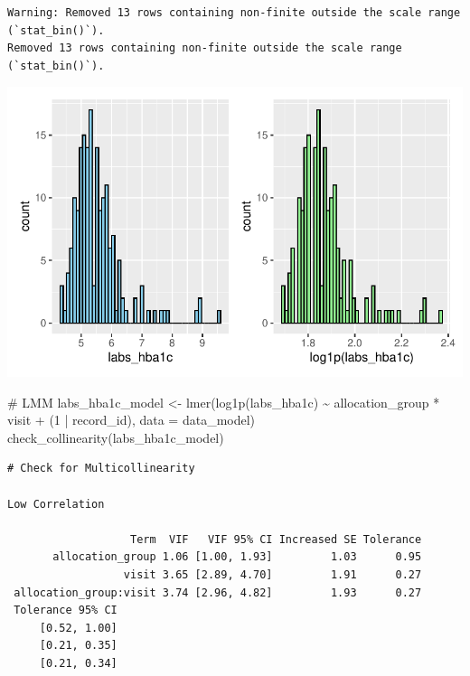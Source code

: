 \documentclass[
  letterpaper,
  DIV=11,
  numbers=noendperiod]{scrartcl}
\newenvironment{Shaded}{\begin{snugshade}}{\end{snugshade}}
\newcommand{\AttributeTok}[1]{\textcolor[rgb]{0.40,0.45,0.13}{#1}}
\newcommand{\CommentTok}[1]{\textcolor[rgb]{0.37,0.37,0.37}{#1}}
\newcommand{\DecValTok}[1]{\textcolor[rgb]{0.68,0.00,0.00}{#1}}
\newcommand{\FunctionTok}[1]{\textcolor[rgb]{0.28,0.35,0.67}{#1}}
\newcommand{\NormalTok}[1]{\textcolor[rgb]{0.00,0.23,0.31}{#1}}
\newcommand{\OtherTok}[1]{\textcolor[rgb]{0.00,0.23,0.31}{#1}}
\newcommand{\SpecialCharTok}[1]{\textcolor[rgb]{0.37,0.37,0.37}{#1}}
\begin{document}
\begin{verbatim}
Warning: Removed 13 rows containing non-finite outside the scale range (`stat_bin()`).
Removed 13 rows containing non-finite outside the scale range (`stat_bin()`).
\end{verbatim}

\includegraphics{Outcomes_V1V2V3_files/figure-pdf/labs_hba1c_1-1.pdf}

\begin{Shaded}
\begin{Highlighting}[]
\CommentTok{\# LMM}
\NormalTok{labs\_hba1c\_model }\OtherTok{\textless{}{-}} \FunctionTok{lmer}\NormalTok{(}\FunctionTok{log1p}\NormalTok{(labs\_hba1c) }\SpecialCharTok{\textasciitilde{}}\NormalTok{ allocation\_group }\SpecialCharTok{*}\NormalTok{ visit }\SpecialCharTok{+}\NormalTok{ (}\DecValTok{1} \SpecialCharTok{|}\NormalTok{ record\_id), }\AttributeTok{data =}\NormalTok{ data\_model)}
\FunctionTok{check\_collinearity}\NormalTok{(labs\_hba1c\_model)}
\end{Highlighting}
\end{Shaded}

\begin{verbatim}
# Check for Multicollinearity

Low Correlation

                   Term  VIF   VIF 95% CI Increased SE Tolerance
       allocation_group 1.06 [1.00, 1.93]         1.03      0.95
                  visit 3.65 [2.89, 4.70]         1.91      0.27
 allocation_group:visit 3.74 [2.96, 4.82]         1.93      0.27
 Tolerance 95% CI
     [0.52, 1.00]
     [0.21, 0.35]
     [0.21, 0.34]
\end{verbatim}
\end{document}
